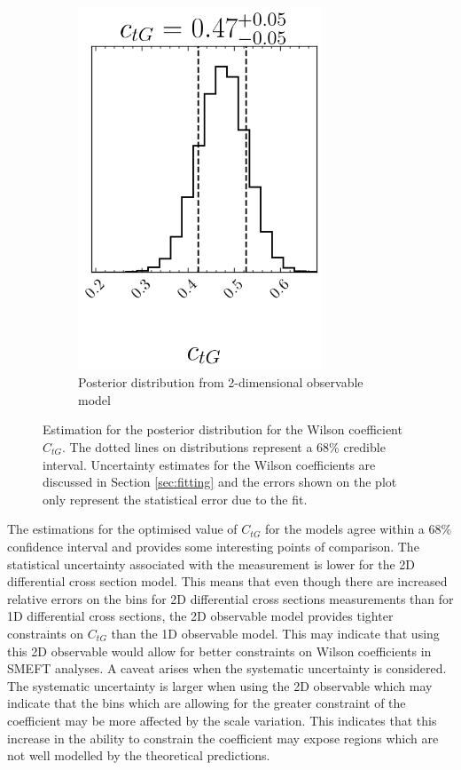 \documentclass[a4paper,11pt]{article}
\begin{document}
\begin{figure}[H]
\begin{subfigure}[b]{0.4\textwidth}
        \includegraphics[width=0.8\textwidth]{plots/ATLAS-ctg_2D_1OP.png}
        \caption{Posterior distribution from 2-dimensional observable model}
    \end{subfigure}
    \caption{Estimation for the posterior distribution for the Wilson coefficient $C_{tG}$. The dotted lines on distributions represent a 68\% credible interval. Uncertainty estimates for the Wilson coefficients are discussed in Section \ref{sec:fitting} and the errors shown on the plot only represent the statistical error due to the fit.}
    \label{fig:corner_1OP}
\end{figure}

The estimations for the optimised value of $C_{tG}$ for the models agree within a 68\% confidence interval and provides some interesting points of comparison.
The statistical uncertainty associated with the measurement is lower for the 2D differential cross section model.
This means that even though there are increased relative errors on the bins for 2D differential cross sections measurements than for 1D differential cross sections, the 2D observable model provides tighter constraints on $C_{tG}$ than the 1D observable model.
This may indicate that using this 2D observable would allow for better constraints on Wilson coefficients in SMEFT analyses.
A caveat arises when the systematic uncertainty is considered.
The systematic uncertainty is larger when using the 2D observable which may indicate that the bins which are allowing for the greater constraint of the coefficient may be more affected by the scale variation.
This indicates that this increase in the ability to constrain the coefficient may expose regions which are not well modelled by the theoretical predictions.
\end{document}

